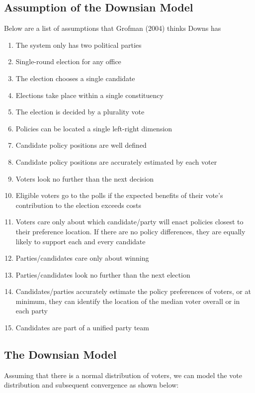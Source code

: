 \documentclass[12pt, letterpaper]{article}
\begin{document}
\subsection{Assumption of the Downsian Model}
Below are a list of assumptions that Grofman (2004) thinks Downs has
\begin{enumerate}
	\item The system only has two political parties
	\item Single-round election for any office
	\item The election chooses a single candidate
	\item Elections take place within a single constituency
	\item The election is decided by a plurality vote
	\item Policies can be located a single left-right dimension
	\item Candidate policy positions are well defined
	\item Candidate policy positions are accurately estimated by each voter
	\item Voters look no further than the next decision
	\item Eligible voters go to the polls if the expected benefits of their vote's contribution to the election exceeds costs
	\item Voters care only about which candidate/party will enact policies closest to their preference location. If there are no policy differences, they are equally likely to support each and every candidate
	\item Parties/candidates care only about winning
	\item Parties/candidates look no further than the next election
	\item Candidates/parties accurately estimate the policy preferences of voters, or at minimum, they can identify the location of the median voter overall or in each party
	\item Candidates are part of a unified party team
\end{enumerate}

\subsection{The Downsian Model}
Assuming that there is a normal distribution of voters, we can model the vote distribution and subsequent convergence as shown below:
\begin{center}
\end{center}
\end{document}
